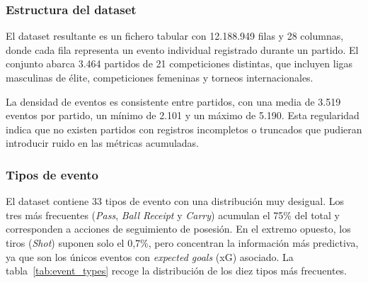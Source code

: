 \subsubsection{Estructura del dataset}

El dataset resultante es un fichero tabular con 12.188.949 filas y 28 columnas, donde cada fila representa un evento individual registrado durante un partido. El conjunto abarca 3.464 partidos de 21 competiciones distintas, que incluyen ligas masculinas de élite, competiciones femeninas y torneos internacionales.

La densidad de eventos es consistente entre partidos, con una media de 3.519 eventos por partido, un mínimo de 2.101 y un máximo de 5.190. Esta regularidad indica que no existen partidos con registros incompletos o truncados que pudieran introducir ruido en las métricas acumuladas.

\subsubsection{Tipos de evento}

El dataset contiene 33 tipos de evento con una distribución muy desigual. Los tres más frecuentes (\textit{Pass}, \textit{Ball Receipt} y \textit{Carry}) acumulan el 75\% del total y corresponden a acciones de seguimiento de posesión. En el extremo opuesto, los tiros (\textit{Shot}) suponen solo el 0,7\%, pero concentran la información más predictiva, ya que son los únicos eventos con \textit{expected goals} (xG) asociado. La tabla~\ref{tab:event_types} recoge la distribución de los diez tipos más frecuentes.

